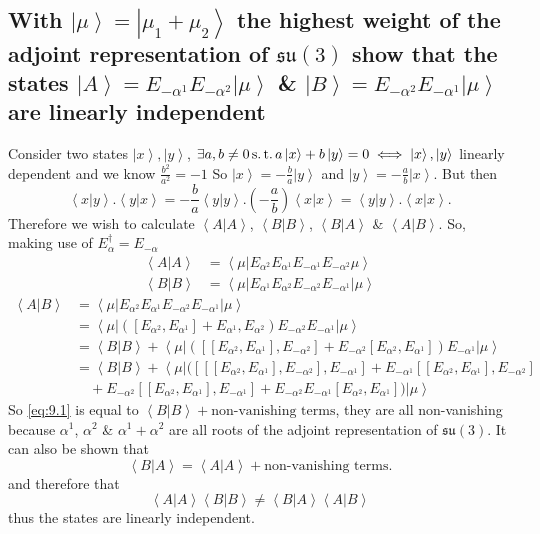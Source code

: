 \documentclass[main.tex]{subfiles}
\begin{document}
\subsection{With $\left|\mu\right>=\left|\mu_1+\mu_2\right>$ the highest weight of the adjoint representation of $\mathfrak{su}(3)$ show that the states $\left|A\right>=E_{-\alpha^1}E_{-\alpha^2}\left|\mu\right>$ \& $\left|B\right>=E_{-\alpha^2}E_{-\alpha^1}\left|\mu\right>$ are linearly independent}
Consider two states $\left|x\right>, \left|y\right>$, $\exists a,b\neq0 \operatorname{s.t.} a\left|x\right>+ b\left|y\right>=0 \iff\left|x\right>, \left|y\right>$ linearly dependent and we know  $\frac{b^2}{a^2}=-1$ So $\left|x\right>= -\frac{b}{a}\left|y\right>$ and $\left|y\right>= -\frac{a}{b}\left|x\right>$. But then
\begin{equation}
\left<x|y\right>.\left<y|x\right>=-\frac{b}{a}\left<y|y\right>.\left(-\frac{a}{b}\right)\left<x|x\right>=\left<y|y\right>.\left<x|x\right>.
\end{equation}
Therefore we wish to calculate $\left<A|A\right>$, $\left<B|B\right>$, $\left<B|A\right>$ \& $\left<A|B\right>$. So, making use of $E_{\alpha}^{\dagger}=E_{-\alpha}$
\begin{align}
\left<A|A\right>&=\left<\mu|E_{\alpha^2}E_{\alpha^1}E_{-\alpha^1}E_{-\alpha^2}\mu\right>\\
\left<B|B\right>&=\left<\mu|E_{\alpha^1}E_{\alpha^2}E_{-\alpha^2}E_{-\alpha^1}|\mu\right>
\end{align}
\begin{align}
\left<A|B\right>&=\left<\mu|E_{\alpha^2}E_{\alpha^1}E_{-\alpha^2}E_{-\alpha^1}|\mu\right>\\
&=\left<\mu|([E_{\alpha^2},E_{\alpha^1}]+E_{\alpha^1},E_{\alpha^2})E_{-\alpha^2}E_{-\alpha^1}|\mu\right>\\
&=\left<B|B\right> + \left<\mu|\left(\left[[E_{\alpha^2},E_{\alpha^1}],E_{-\alpha^2}\right]+E_{-\alpha^2}[E_{\alpha^2},E_{\alpha^1}]\right)E_{-\alpha^1}|\mu\right>\\
&=\left<B|B\right> +
\left<\mu\right|\big(\left[\left[\left[E_{\alpha^2},E_{\alpha^1}\right],E_{-\alpha^2}\right],E_{-\alpha^1}\right] +E_{-\alpha^1}[[E_{\alpha^2},E_{\alpha^1}],E_{-\alpha^2}] \nonumber\\      &\quad+E_{-\alpha^2}[[E_{\alpha^2},E_{\alpha^1}],E_{-\alpha^1}]  +E_{-\alpha^2}E_{-\alpha^1}[E_{\alpha^2},E_{\alpha^1}]
\big)\left|\mu\right>\label{eq:9.1}
\end{align}
So \eqref{eq:9.1} is equal to $\left<B|B\right> + \text{non-vanishing terms}$, they are all non-vanishing because $\alpha^1$, $\alpha^2$ \& $\alpha^1+\alpha^2$ are all roots of the adjoint representation of $\mathfrak{su}(3)$. It can also be shown that 
\begin{equation}
\left<B|A\right>=\left<A|A\right> + \text{non-vanishing terms}.
\end{equation}
and therefore that
\begin{equation}
\left<A|A\right>\left<B|B\right>\neq \left<B|A\right> \left<A|B\right>
\end{equation}
thus the states are linearly independent.
\end{document}
